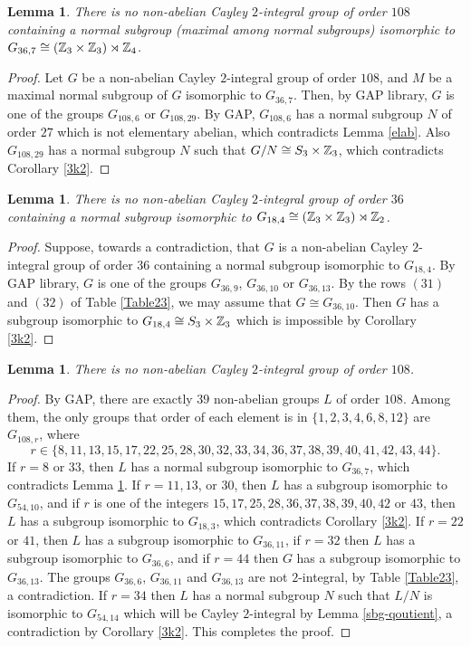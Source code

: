 \documentclass{amsart}
\newtheorem{lem}[thm]{Lemma}
\begin{document}
	\begin{lem}\label{1088}
	There is no non-abelian Cayley $2$-integral group of order $108$ containing a normal subgroup (maximal among normal subgroups) isomorphic to $G_{36,7}\cong (\Bbb Z_3\times\Bbb Z_3)\rtimes\Bbb Z_4$.
\end{lem}
\begin{proof}
	Let $G$ be a non-abelian Cayley $2$-integral group of order $108$, and $M$ be a maximal normal subgroup of $G$ isomorphic to  $G_{36,7}$. Then, by GAP library, $G$ is one of the groups $G_{108,6}$ or $G_{108,29}$. By GAP, $G_{108,6}$ has a normal subgroup $N$ of order $27$ which is not elementary abelian, which contradicts Lemma \ref{elab}. Also $G_{108,29}$ has a normal subgroup $N$ such that $G/N\cong S_3\times\Bbb Z_3$, which contradicts Corollary \ref{3k2}.
\end{proof}

\begin{lem}\label{36-18} There is no non-abelian Cayley $2$-integral group of order $36$ containing a  normal subgroup isomorphic to $G_{18,4}\cong (\Bbb Z_3\times\Bbb Z_3)\rtimes\Bbb Z_2$.
\end{lem}
\begin{proof}
	Suppose, towards a contradiction, that $G$ is a non-abelian Cayley $2$-integral group of order $36$ containing a normal subgroup isomorphic to $G_{18,4}$. By GAP library, $G$ is one of the
	groups $G_{36,9}$,  $G_{36,10}$ or $G_{36,13}$. By the rows $(31)$ and $(32)$ of Table \ref{Table23}, we may assume that $G\cong G_{36,10}$. Then $G$ has a subgroup isomorphic to $G_{18,4}\cong S_3\times\Bbb Z_3$ which is impossible by Corollary \ref{3k2}. 
\end{proof}

	\begin{lem}\label{108}
	There is no non-abelian Cayley $2$-integral group of order $108$.
\end{lem}
\begin{proof}
	By GAP, there are exactly $39$ non-abelian groups  $L$ of order $108$. Among them, the only groups that order of each element is in $\{1,2,3,4,6,8,12\}$
	are $G_{108,r}$, where 
	$$r\in\{8,11,13,15,17,22,25,28,30,32,33,34,36,37,38,39,40,41,42,43,44\}.$$
	If $r=8$ or $33$, then $L$ has a normal subgroup isomorphic to $G_{36,7}$, which contradicts Lemma \ref{1088}. If $r=11,13$, or $30$, then $L$ has a subgroup isomorphic to $G_{54,10}$, and if  $r$ is one of the integers $15,17,25,28,36,37,38,39,40,42$ or $43$, then $L$ has a subgroup isomorphic to $G_{18,3}$, which contradicts Corollary \ref{3k2}. If $r=22$ or $41$, then $L$ has a subgroup isomorphic to $G_{36,11}$, if $r=32$ then $L$ has a subgroup isomorphic to $G_{36,6}$, and if $r=44$ then $G$ has a subgroup isomorphic to $G_{36,13}$. The groups $G_{36,6}$, $G_{36,11}$ and $G_{36,13}$ are not $2$-integral, by Table \ref{Table23}, a contradiction. If $r=34$ then $L$ has
	a normal subgroup $N$ such that $L/N$ is isomorphic to $G_{54,14}$ which will be Cayley $2$-integral by Lemma \ref{sbg-qoutient}, a contradiction by Corollary \ref{3k2}. This completes the proof. 
\end{proof} 
\end{document}
